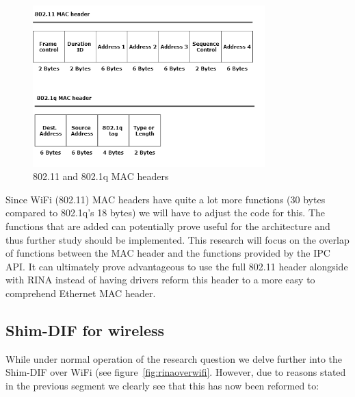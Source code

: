 \begin{figure}[H]
    \centering
    \includegraphics[width=0.8\textwidth]{figures/80211vs8021q}
    \caption{802.11 and 802.1q MAC headers} 
    \label{fig:80211vs8021q}
\end{figure}

\npar

Since WiFi (802.11) MAC headers have quite a lot more functions (30 bytes compared to 802.1q's 18 bytes) we will have to adjust the code for this. The functions that are added can potentially prove useful for the architecture and thus further study should be implemented. This research will focus on the overlap of functions between the MAC header and the functions provided by the IPC API. It can ultimately prove advantageous to use the full 802.11 header alongside with RINA instead of having drivers reform this header to a more easy to comprehend Ethernet MAC header. 


\subsection{Shim-DIF for wireless}

While under normal operation of the research question we delve further into the Shim-DIF over WiFi (see figure~\ref{fig:rinaoverwifi}. However, due to reasons stated in the previous segment we clearly see that this has now been reformed to:

